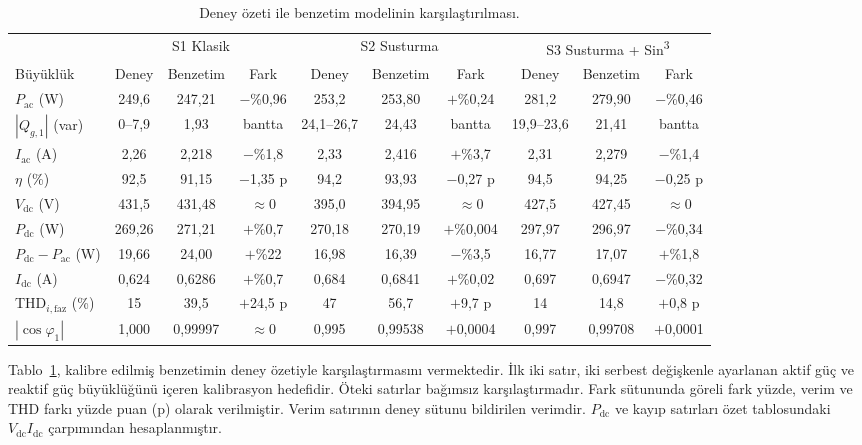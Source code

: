 \begin{table}[H]
  \centering
  \caption{Deney özeti ile benzetim modelinin karşılaştırılması.}
  \label{tab:kalibrasyon-karsilastirma}
  \scriptsize
  \setlength{\tabcolsep}{2.6pt}
  \begin{tabular}{@{}l ccc ccc ccc@{}}
    \toprule
    & \multicolumn{3}{c}{S1 Klasik} & \multicolumn{3}{c}{S2 Susturma} & \multicolumn{3}{c}{S3 Susturma + Sin\textsuperscript{3}} \\
    \cmidrule(lr){2-4}\cmidrule(lr){5-7}\cmidrule(lr){8-10}
    Büyüklük & Deney & Benzetim & Fark & Deney & Benzetim & Fark & Deney & Benzetim & Fark \\
    \midrule
    $P_{\mathrm{ac}}$ (W) & 249,6 & 247,21 & $-$\%0,96 & 253,2 & 253,80 & $+$\%0,24 & 281,2 & 279,90 & $-$\%0,46 \\
    $|Q_{g,1}|$ (var) & 0--7,9 & 1,93 & bantta & 24,1--26,7 & 24,43 & bantta & 19,9--23,6 & 21,41 & bantta \\
    \midrule
    $I_{\mathrm{ac}}$ (A) & 2,26 & 2,218 & $-$\%1,8 & 2,33 & 2,416 & $+$\%3,7 & 2,31 & 2,279 & $-$\%1,4 \\
    $\eta$ (\%) & 92,5 & 91,15 & $-$1,35 p & 94,2 & 93,93 & $-$0,27 p & 94,5 & 94,25 & $-$0,25 p \\
    $V_{\mathrm{dc}}$ (V) & 431,5 & 431,48 & $\approx0$ & 395,0 & 394,95 & $\approx0$ & 427,5 & 427,45 & $\approx0$ \\
    $P_{\mathrm{dc}}$ (W) & 269,26 & 271,21 & $+$\%0,7 & 270,18 & 270,19 & $+$\%0,004 & 297,97 & 296,97 & $-$\%0,34 \\
    $P_{\mathrm{dc}}-P_{\mathrm{ac}}$ (W) & 19,66 & 24,00 & $+$\%22 & 16,98 & 16,39 & $-$\%3,5 & 16,77 & 17,07 & $+$\%1,8 \\
    $I_{\mathrm{dc}}$ (A) & 0,624 & 0,6286 & $+$\%0,7 & 0,684 & 0,6841 & $+$\%0,02 & 0,697 & 0,6947 & $-$\%0,32 \\
    THD$_{i,\mathrm{faz}}$ (\%) & 15 & 39,5 & $+$24,5 p & 47 & 56,7 & $+$9,7 p & 14 & 14,8 & $+$0,8 p \\
    $|\cos\varphi_1|$ & 1,000 & 0,99997 & $\approx0$ & 0,995 & 0,99538 & $+$0,0004 & 0,997 & 0,99708 & $+$0,0001 \\
    \bottomrule
  \end{tabular}
\end{table}

Tablo~\ref{tab:kalibrasyon-karsilastirma}, kalibre edilmiş benzetimin deney özetiyle karşılaştırmasını vermektedir. İlk iki satır, iki serbest değişkenle ayarlanan aktif güç ve reaktif güç büyüklüğünü içeren kalibrasyon hedefidir. Öteki satırlar bağımsız karşılaştırmadır. Fark sütununda göreli fark yüzde, verim ve THD farkı yüzde puan (p) olarak verilmiştir. Verim satırının deney sütunu bildirilen verimdir. $P_{\mathrm{dc}}$ ve kayıp satırları özet tablosundaki $V_{\mathrm{dc}}I_{\mathrm{dc}}$ çarpımından hesaplanmıştır.


